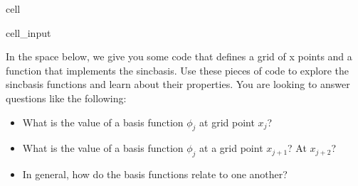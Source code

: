 \documentclass[letterpaper,10pt,english]{jupyterBook}
\begin{document}
\begin{sphinxuseclass}{cell}\begin{sphinxVerbatimInput}

\begin{sphinxuseclass}{cell_input}
\begin{sphinxVerbatim}[commandchars=\\\{\}]
   
   
\end{sphinxVerbatim}

\end{sphinxuseclass}\end{sphinxVerbatimInput}

\end{sphinxuseclass}
\sphinxAtStartPar
In the space below, we give you some code that defines a grid of x points and a function that implements the sinc\sphinxhyphen{}basis. Use these pieces of code to explore the sinc\sphinxhyphen{}basis functions and learn about their properties. You are looking to answer questions like the following:
\begin{itemize}
\item {} 
\sphinxAtStartPar
What is the value of a basis function \(\phi_j\) at grid point \(x_j\)?

\item {} 
\sphinxAtStartPar
What is the value of a basis function \(\phi_j\) at a grid point \(x_{j+1}\)? At \(x_{j+2}\)?

\item {} 
\sphinxAtStartPar
In general, how do the basis functions relate to one another?

\end{itemize}
\end{document}
